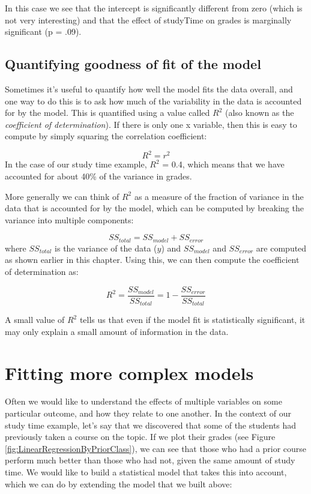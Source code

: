 \documentclass[12pt,]{book}
\theoremstyle{definition}
\theoremstyle{definition}
\theoremstyle{definition}
\theoremstyle{remark}
\begin{document}
In this case we see that the intercept is significantly different from zero (which is not very interesting) and that the effect of studyTime on grades is marginally significant (p = .09).

\hypertarget{quantifying-goodness-of-fit-of-the-model}{%
\subsection{Quantifying goodness of fit of the model}\label{quantifying-goodness-of-fit-of-the-model}}

Sometimes it's useful to quantify how well the model fits the data overall, and one way to do this is to ask how much of the variability in the data is accounted for by the model. This is quantified using a value called \(R^2\) (also known as the \emph{coefficient of determination}). If there is only one x variable, then this is easy to compute by simply squaring the correlation coefficient:

\[
R^2 = r^2
\]
In the case of our study time example, \(R^2\) = 0.4, which means that we have accounted for about 40\% of the variance in grades.

More generally we can think of \(R^2\) as a measure of the fraction of variance in the data that is accounted for by the model, which can be computed by breaking the variance into multiple components:

\[
SS_{total} = SS_{model} + SS_{error}
\]
where \(SS_{total}\) is the variance of the data (\(y\)) and \(SS_{model}\) and \(SS_{error}\) are computed as shown earlier in this chapter. Using this, we can then compute the coefficient of determination as:

\[
R^2 = \frac{SS_{model}}{SS_{total}} = 1 - \frac{SS_{error}}{SS_{total}}
\]

A small value of \(R^2\) tells us that even if the model fit is statistically significant, it may only explain a small amount of information in the data.

\hypertarget{fitting-more-complex-models}{%
\section{Fitting more complex models}\label{fitting-more-complex-models}}

Often we would like to understand the effects of multiple variables on some particular outcome, and how they relate to one another. In the context of our study time example, let's say that we discovered that some of the students had previously taken a course on the topic. If we plot their grades (see Figure \ref{fig:LinearRegressionByPriorClass}), we can see that those who had a prior course perform much better than those who had not, given the same amount of study time. We would like to build a statistical model that takes this into account, which we can do by extending the model that we built above:
\end{document}
